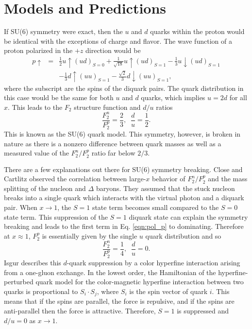 \section{Models and Predictions}
If SU(6) symmetry were exact, then the $u$ and $d$ quarks within the proton would be identical with the exceptions of charge and flavor. The wave function of a proton polarized in the $+z$ direction \cite{book:close}  would be
\begin{eqnarray}
\label{eqn:pol_p}
\nonumber
p \uparrow &=& \frac{1}{2}u\uparrow(ud)_{S=0} + \frac{1}{\sqrt{18}}u\uparrow (ud)_{S=1} - \frac{1}{3}u\downarrow(ud)_{S=1} \\
&&- \frac{1}{3}d\uparrow(uu)_{S=1} - \frac{\sqrt{2}}{3}d\downarrow(uu)_{S=1},
\end{eqnarray}
where the subscript are the spins of the diquark pairs. The quark distribution in this case would be the same for both $u$ and $d$ quarks, which implies $u=2d$ for all $x$. This leads to the $F_2$ structure function and $d/u$ ratios
\begin{equation}
\frac{F_2^n}{F_2^p}  = \frac{2}{3}, \; \; \frac{d}{u} = \frac{1}{2}.
\end{equation}
This is known as the SU(6) quark model. This symmetry, however, is broken in nature as there is a nonzero difference between quark masses as well as a measured value of the $F_2^n/F_2^p$ ratio far below $2/3$.

There are a few explanations out there for SU(6) symmetry breaking. Close \cite{physrep:close} and Cartlitz \cite{physrep:carlitz} observed the correlation between large-$x$ behavior of $F_2^n/F_2^p$ and the mass splitting of the nucleon and $\Delta$ baryons. They assumed that the stuck nucleon breaks into a single quark which interacts with the virtual photon and a diquark pair. When $x \rightarrow 1$, the $S=1$ state term becomes small compared to the $S=0$ state term. This suppression of the $S=1$ diquark state can explain the symmetry breaking and leads to the first term in Eq. \ref{eqn:pol_p} to dominating. Therefore at $x\approx 1$, $F_2^p$ is essentially given by the single $u$ quark distribution and so
\begin{equation}
\frac{F_2^n}{F_2^p}  = \frac{1}{4}, \; \; \frac{d}{u} =0.
\end{equation}
Isgur \cite{physrep:insgur1} \cite{physrep:insgur2} describes this $d$-quark suppression by a color hyperfine interaction arising from a one-gluon exchange. In the lowest order, the Hamiltonian of the hyperfine-perturbed quark model for the color-magnetic hyperfine interaction between two quarks is proportional to $S_i \cdot S_j$, where $S_i$ is the spin vector of quark $i$. This means that if the spins are parallel, the force is repulsive, and if the spins are anti-parallel then the force is attractive. Therefore, $S=1$ is suppressed and $d/u =0$ as $x \rightarrow 1$.

